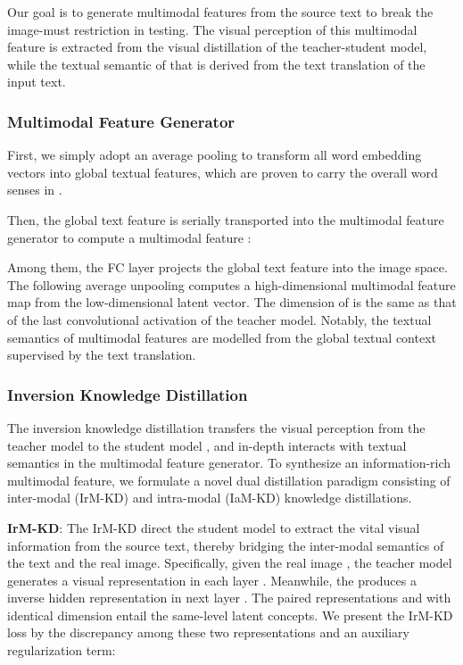\documentclass[11pt]{article}
\begin{document}
Our goal is to generate multimodal features from the source text to break the image-must restriction in testing.
The visual perception of this multimodal feature is extracted from the visual distillation of the teacher-student model, while the textual semantic of that is derived from the text translation of the input text.


\subsubsection{Multimodal Feature Generator}
First, we simply adopt an average pooling to transform all word embedding vectors into global textual features, which are proven to carry the overall word senses in \cite{zhang2010understanding}.


Then, the global text feature  is serially transported into the multimodal feature generator to compute a multimodal feature :


Among them, the FC layer  projects the global text feature  into the image space.
The following average unpooling computes a high-dimensional multimodal feature map from the low-dimensional latent vector.
The dimension of  is the same as that of the last convolutional activation of the teacher model.
Notably, the textual semantics of multimodal features are modelled from the global textual context supervised by the text translation.

\subsubsection{Inversion Knowledge Distillation}
The inversion knowledge distillation transfers the visual perception from the teacher model  to the student model , and in-depth interacts with textual semantics in the multimodal feature generator.
To synthesize an information-rich multimodal feature, we formulate a novel dual distillation paradigm consisting of inter-modal (IrM-KD) and intra-modal (IaM-KD) knowledge distillations.


\textbf{IrM-KD}:
The IrM-KD direct the student model  to extract the vital visual information from the source text, thereby bridging the inter-modal semantics of the text and the real image.
Specifically, given the real image , the teacher model  generates a visual representation  in each layer .
Meanwhile, the  produces a inverse hidden representation  in next layer .
The paired representations  and  with identical dimension entail the same-level latent concepts.
We present the IrM-KD loss by the discrepancy among these two representations and an auxiliary regularization term:
\end{document}
